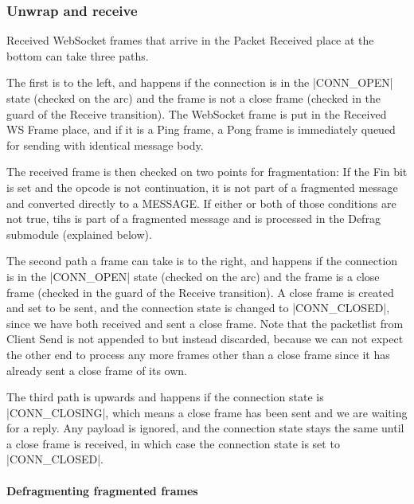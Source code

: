 	\subsubsection{Unwrap and receive}
		
		
		Received WebSocket frames that arrive in the Packet Received place at the
		bottom can take three paths. 
		
		The first is to the left, and happens if the
		connection is in the |CONN_OPEN| state (checked on the arc) and the
		frame is not a close frame (checked in the guard of the Receive transition). The WebSocket
		frame is put in the Received WS Frame place, and if it is a Ping frame, a Pong
		frame is immediately queued for sending with identical message body. 
		
		The received frame is then checked on two points for fragmentation: If the Fin
		bit is set and the opcode is not continuation, it is not part of a fragmented
		message and converted directly to a MESSAGE. If either or both of those
		conditions are not true, tihs is part of a fragmented message and is processed
		in the Defrag submodule (explained below).
		
		The second path a frame can take is to the right, and happens if the
		connection is in the |CONN_OPEN| state (checked on the arc) and the
		frame is a close frame (checked in the guard of the Receive transition). A
		close frame is created and set to be sent, and the
		connection state is changed to |CONN_CLOSED|, since we have both
		received and sent a close frame. Note that the packetlist from Client Send is
		not appended to but instead discarded, because we can not expect the other
		end to process any more frames other than a close frame since it has already
		sent a close frame of its own.
		
		The third path is upwards and happens if the connection state is
		|CONN_CLOSING|, which means a close frame has been sent and we are
		waiting for a reply. Any payload is ignored, and the connection state stays
		the same until a close frame is received, in which case the connection state
		is set to |CONN_CLOSED|. 
		
		\paragraph{Defragmenting fragmented frames}
			
			
